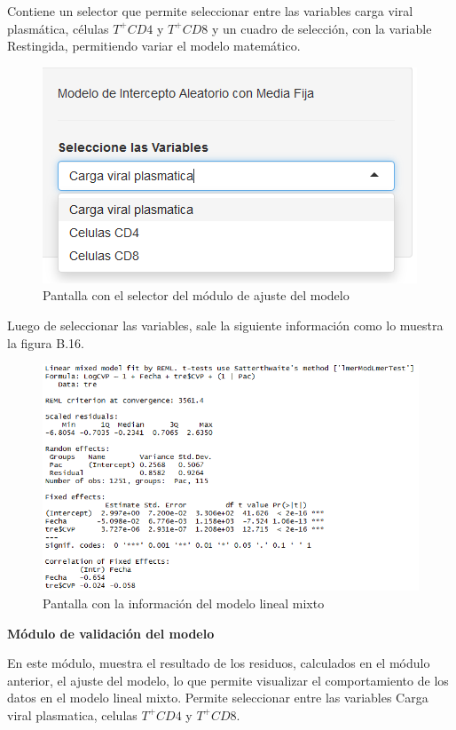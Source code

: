 Contiene un selector que permite seleccionar entre las variables carga viral plasm\'atica, c\'elulas $T^{+}CD4$ y $T^{+}CD8$ y un cuadro de selecci\'on, con la variable Restingida, permitiendo variar el modelo matem\'atico.

\begin{figure}[H]
\centering
\includegraphics[scale=0.6]{cuadrosele.PNG}
\caption{Pantalla con el selector del m\'odulo de ajuste del modelo}
\end{figure}

Luego de seleccionar las variables, sale la siguiente informaci\'on como lo muestra la figura B.16.

\begin{figure}[H]
\centering
\includegraphics[scale=0.6]{lme.png}
\caption{Pantalla con la informaci\'on del modelo lineal mixto}
\end{figure}

 \noindent
\textbf{M\'odulo de validaci\'on del modelo}

En este m\'odulo, muestra el resultado de los residuos, calculados en el m\'odulo anterior, el ajuste del modelo, lo que permite visualizar el comportamiento de los datos en el modelo lineal mixto. Permite seleccionar entre las variables Carga viral plasmatica, celulas $T^{+}CD4$ y $T^{+}CD8$.

